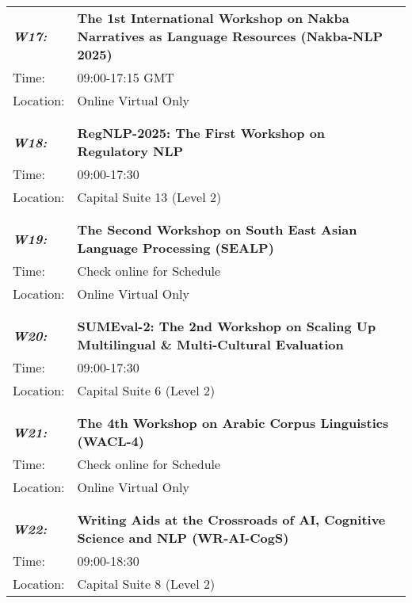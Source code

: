 \begin{longtable}{p{15mm}p{100mm}}
\emph{\textbf{W17:}} & \textbf{The 1st International Workshop on Nakba Narratives as Language Resources (Nakba-NLP 2025)} \\
Time: & 09:00-17:15 GMT \\
Location: & Online Virtual Only \\\\
\hline\\
\emph{\textbf{W18:}} & \textbf{RegNLP-2025: The First Workshop on Regulatory NLP} \\
Time: & 09:00-17:30 \\
Location: & Capital Suite 13 (Level 2) \\\\
\hline\\
\emph{\textbf{W19:}} & \textbf{The Second Workshop on South East Asian Language Processing (SEALP)} \\
Time: & Check online for Schedule \\
Location: & Online Virtual Only \\\\
\hline\\
\emph{\textbf{W20:}} & \textbf{SUMEval-2: The 2nd Workshop on Scaling Up Multilingual \& Multi-Cultural Evaluation} \\
Time: & 09:00-17:30 \\
Location: & Capital Suite 6 (Level 2) \\\\
\hline\\
\emph{\textbf{W21:}} & \textbf{The 4th Workshop on Arabic Corpus Linguistics (WACL-4)} \\
Time: & Check online for Schedule \\
Location: & Online Virtual Only \\\\
\hline\\
\emph{\textbf{W22:}} & \textbf{Writing Aids at the Crossroads of AI, Cognitive Science and NLP (WR-AI-CogS)} \\
Time: & 09:00-18:30 \\
Location: & Capital Suite 8 (Level 2) \\
\end{longtable}